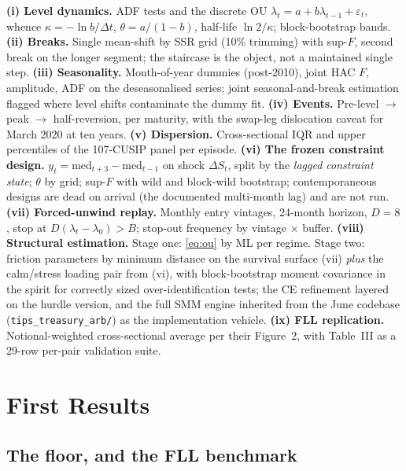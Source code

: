 \documentclass[11pt]{article}
\begin{document}
\textbf{(i) Level dynamics.} ADF tests and the discrete OU $\lambda_t=a+b\lambda_{t-1}+\varepsilon_t$, whence $\kappa=-\ln b/\Delta t$, $\theta=a/(1-b)$, half-life $\ln2/\kappa$; block-bootstrap bands. \textbf{(ii) Breaks.} Single mean-shift by SSR grid (10\% trimming) with sup-$F$, second break on the longer segment; the staircase is the object, not a maintained single step. \textbf{(iii) Seasonality.} Month-of-year dummies (post-2010), joint HAC $F$, amplitude, ADF on the deseasonalised series; joint seasonal-and-break estimation flagged where level shifts contaminate the dummy fit. \textbf{(iv) Events.} Pre-level $\to$ peak $\to$ half-reversion, per maturity, with the swap-leg dislocation caveat for March 2020 at ten years. \textbf{(v) Dispersion.} Cross-sectional IQR and upper percentiles of the 107-CUSIP panel per episode. \textbf{(vi) The frozen constraint design.} $y_t=\text{med}_{t+3}-\text{med}_{t-1}$ on shock $\Delta S_t$, split by the \emph{lagged constraint state}; $\theta$ by grid; sup-$F$ with wild and block-wild bootstrap; contemporaneous designs are dead on arrival (the documented multi-month lag) and are not run. \textbf{(vii) Forced-unwind replay.} Monthly entry vintages, 24-month horizon, $D=8$, stop at $D(\lambda_t-\lambda_0)>B$; stop-out frequency by vintage $\times$ buffer. \textbf{(viii) Structural estimation.} Stage one: \eqref{eq:ou} by ML per regime. Stage two: friction parameters by minimum distance on the survival surface (vii) \emph{plus} the calm/stress loading pair from (vi), with block-bootstrap moment covariance in the \citet{gkr2014} spirit for correctly sized over-identification tests; the CE refinement layered on the hurdle version, and the full SMM engine inherited from the June codebase (\texttt{tips\_treasury\_arb/}) as the implementation vehicle. \textbf{(ix) FLL replication.} Notional-weighted cross-sectional average per their Figure~2, with Table~III as a 29-row per-pair validation suite.

\section{First Results}\label{sec:results}

\subsection{The floor, and the FLL benchmark}
\end{document}
